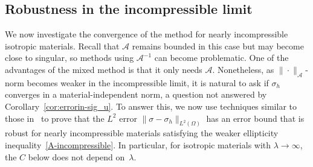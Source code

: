 \documentclass[12pt]{amsart}
\numberwithin{equation}{section}
\theoremstyle{definition}
\theoremstyle{remark}
\renewcommand{\(}{\bigl(}
\renewcommand{\)}{\bigr)}
\newcommand{\Aa}{\mathcal{A}}
\begin{document}
\subsection{Robustness in the incompressible limit}
  
We now investigate the convergence of the method for nearly
incompressible isotropic materials. Recall that $\Aa$ remains bounded
in this case but may become close to singular, so methods using
$\Aa^{-1}$ can become problematic. One of the advantages of the mixed
method is that it only needs $\Aa$. Nonetheless, as
$\| \cdot \|_\Aa$-norm becomes weaker in the incompressible limit, it
is natural to ask if $\sigma_h$ converges in a material-independent
norm, a question not answered by Corollary~\ref{cor:errorin-sig_u}.  To
answer this, we now use techniques similar to those in~\cite{arnold1984family}  to  prove that the $L^2$ error
$\|\sigma - \sigma_h\|_{L^2(\Omega)}$ has an error bound that is
robust for nearly incompressible materials satisfying the weaker
ellipticity inequality~\eqref{A-incompressible}.  In particular, for isotropic  materials with $\lambda \to \infty$, the $C$ below does not depend on~$\lambda$.
  
\end{document}
